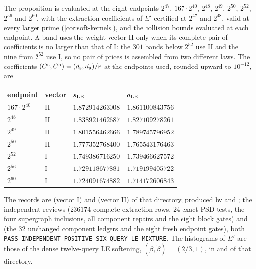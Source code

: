 The proposition is evaluated at the eight endpoints $2^{47}$, $167\cdot2^{40}$,
$2^{48}$, $2^{49}$, $2^{50}$, $2^{52}$, $2^{56}$ and $2^{60}$, with the extraction
coefficients of $E'$ certified at $2^{47}$ and $2^{48}$, valid at every larger prime
(\cref{cor:soft-kernels}), and the collision bounds evaluated at each endpoint. A
band uses the weight vector II only when its complete pair of coefficients is no
larger than that of I: the $301$ bands below $2^{52}$ use II and the nine from
$2^{52}$ use I, so no pair of prices is assembled from two different laws. The
coefficients $(C^{\rm s},C^{\rm a})=(d_{\rm s},d_{\rm a})/r$ at the endpoints used,
rounded upward to $10^{-12}$, are
\begin{center}
\small
\begin{tabular}{@{}llll@{}}
\toprule
endpoint & vector & $s_{\rm LE}$ & $a_{\rm LE}$\\
\midrule
$167\cdot2^{40}$ & II & $1.872914263008$ & $1.861100843756$\\
$2^{48}$ & II & $1.838921462687$ & $1.827109278261$\\
$2^{49}$ & II & $1.801556462666$ & $1.789745796952$\\
$2^{50}$ & II & $1.777352768400$ & $1.765543176463$\\
$2^{52}$ & I & $1.749386716250$ & $1.739466627572$\\
$2^{56}$ & I & $1.729118677881$ & $1.719199405722$\\
$2^{60}$ & I & $1.724091674882$ & $1.714172606843$\\
\bottomrule
\end{tabular}
\end{center}
The records are
 (vector I) and
 (vector II) of that directory, produced by
 and ; the independent reviews
 ($236174$ complete extraction rows, $24$ exact PSD tests,
the four supergraph inclusions, all component repairs and the eight block gates) and
 (the $32$ unchanged component ledgers and the
eight fresh endpoint gates), both \texttt{PASS\_\allowbreak INDEPENDENT\_\allowbreak POSITIVE\_\allowbreak SIX\_\allowbreak QUERY\_\allowbreak LE\_\allowbreak MIXTURE}.
The histograms of $E'$ are those of the dense twelve-query LE softening,
$(\beta,\tilde\beta)=(2/3,1)$, in 
and  of that directory.

